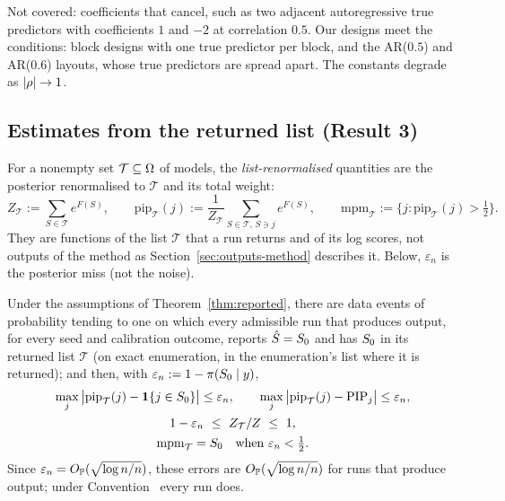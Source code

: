 Not covered: coefficients that cancel, such as two adjacent autoregressive true predictors with coefficients $1$ and $-2$
at correlation $0.5$. Our designs meet the conditions: block designs with one true predictor per block, and the AR($0.5$)
and AR($0.6$) layouts, whose true predictors are spread apart. The constants degrade as $\lvert \rho\rvert\to1$.



\subsection{Estimates from the returned list (Result 3)}\label{sec:supp-list}
 For a nonempty set $\mathcal T\subseteq\Omega$ of models, the
\emph{list-renormalised} quantities are the posterior renormalised to $\mathcal T$ and its total weight:
\[
  Z_{\mathcal T}:=\sum_{S\in\mathcal T}e^{F(S)},\qquad
  \mathrm{pip}_{\mathcal T}(j):=\frac{1}{Z_{\mathcal T}}\sum_{S\in\mathcal T,\,S\ni j}e^{F(S)},\qquad
  \mathrm{mpm}_{\mathcal T}:=\{j:\mathrm{pip}_{\mathcal T}(j)>\tfrac12\}.
\]
They are functions of the list $\mathcal T$ that a run returns and of its log scores, not outputs of the method as
Section~\ref{sec:outputs-method} describes it. Below, $\varepsilon_n$ is the posterior miss (not the noise).

\begin{corollary}\label{cor:list}
Under the assumptions of Theorem~\ref{thm:reported}, there are data events of probability tending to one on which every
admissible run that produces output, for every seed and calibration outcome, reports $\hat S=S_0$ and has $S_0$ in its
returned list $\mathcal T$ (on exact enumeration, in the enumeration's list where it is returned); and then, with
$\varepsilon_n:=1-\pi(S_0\mid y)$,
\begin{gather}
  \max_j\big|\mathrm{pip}_{\mathcal T}(j)-\mathbf{1}\{j\in S_0\}\big|\le\varepsilon_n,\qquad
  \max_j\big|\mathrm{pip}_{\mathcal T}(j)-\mathrm{PIP}_j\big|\le\varepsilon_n,\label{eq:list-pip}\\
  1-\varepsilon_n\ \le\ Z_{\mathcal T}/Z\ \le\ 1,\label{eq:list-z}\\
  \mathrm{mpm}_{\mathcal T}=S_0\quad\text{when }\varepsilon_n<\tfrac12 .\label{eq:list-mpm}
\end{gather}
Since $\varepsilon_n=O_{\mathbb{P}}(\sqrt{\log n/n})$, these errors are $O_{\mathbb{P}}(\sqrt{\log n/n})$ for runs that produce output; under Convention~ every
run does.
\end{corollary}

